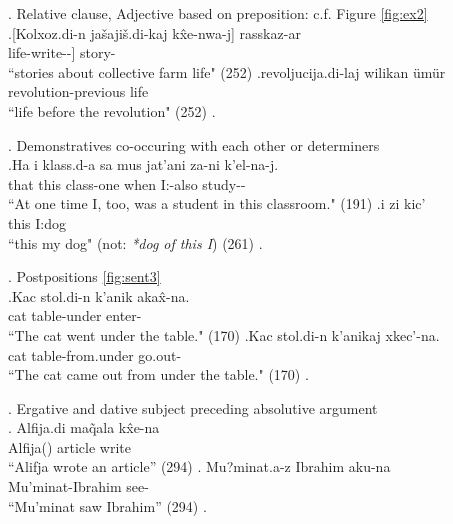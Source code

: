 \ex. Relative clause, Adjective based on preposition: c.f. Figure \ref{fig:ex2} \\
    \ag.\label{sent:ex2a}[Kolxoz.di-n ja\v{s}aji\v{s}.di-kaj k\^{x}e-nwa-j] rasskaz-ar \\
        [kolkhoz-\Gen[] life-\Sbelc[] write-\Prf[]-\Ptcp[]] story-\Pl[] \\
        ``stories about collective farm life" (252)
    \bg.\label{sent:ex2b}revoljucija.di-laj wilikan \"{u}m\"{u}r \\
        revolution-\Srelc[] previous life \\
        ``life before the revolution" (252)
    \z.
    
    
\ex. Demonstratives co-occuring with each other or determiners \\
    \ag.\label{sent:ex6a}Ha i klass.d-a sa mus jat'ani za-ni k'el-na-j. \\
    that this class-\Inessc[] one when \Indf[] I:\Erg[]-also study-\Aori[]-\Pst[] \\
    ``At one time I, too, was a student in this classroom." (191)
    \bg.\label{sent:ex6b}i zi kic' \\
    this I:\Gen[] dog \\
    ``this my dog" (not: \textit{*dog of this I}) (261)
    \z.

\ex. \label{sent:ex3}Postpositions \ref{fig:sent3}\\
    \ag.\label{sent:ex3a}Kac stol.di-n k'anik aka\^{x}-na. \\
        cat table-\Gen[] under enter-\Aori[] \\
        ``The cat went under the table." (170) 
    \bg.\label{sent:ex3b}Kac stol.di-n k'anikaj xkec'-na. \\
        cat table-\Gen[] from.under go.out-\Aori[] \\
        ``The cat came out from under the table." (170)
    \z.

\ex.\label{sent:ex5} Ergative and dative subject preceding absolutive argument \\
    \ag. Alfija.di ma\~{q}ala k\^{x}e-na \\
        Alfija(\Erg[]) article write \\
        ``Alifja wrote an article'' (294)
    \bg. Mu?minat.a-z Ibrahim aku-na \\
        Mu'minat-\Dat[] Ibrahim see-\Aori \\
        ``Mu'minat saw Ibrahim'' (294)
    \z.

